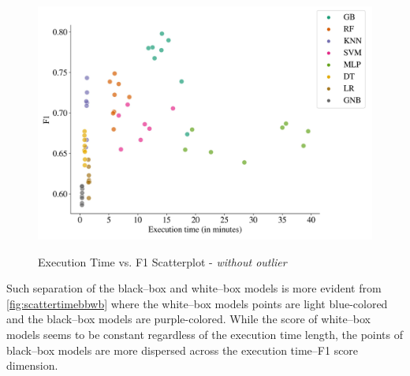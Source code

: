 \begin{figure}[H]
\centering
\caption{Execution Time vs. F1 Scatterplot - \textit{without outlier}}\vspace{0.5em}
\label{fig:scattertime}\
\includegraphics[width=140mm]{Figures/Scatterplot_execution_time_F1_wo_outliers.jpg}

\vspace{-1em}
\end{figure}

\newpage
Such separation of the black--box and white--box models is more evident from \autoref{fig:scattertimebbwb} where the white--box models points are light blue-colored and the black--box models are purple-colored.
While the score of white--box models seems to be constant regardless of the execution time length, the points of black--box models are more dispersed across the execution time--F1 score dimension.

